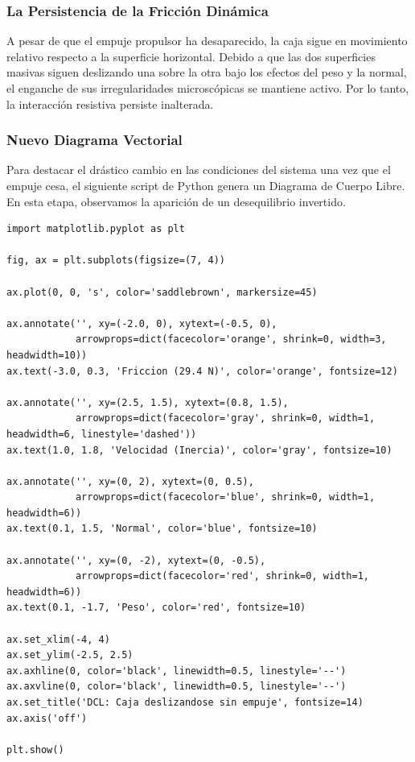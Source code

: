 \documentclass[12pt]{article}
\begin{document}
\subsubsection*{La Persistencia de la Fricción Dinámica}
A pesar de que el empuje propulsor ha desaparecido, la caja sigue en movimiento relativo respecto a la superficie horizontal. Debido a que las dos superficies masivas siguen deslizando una sobre la otra bajo los efectos del peso y la normal, el enganche de sus irregularidades microscópicas se mantiene activo. Por lo tanto, la interacción resistiva persiste inalterada.

\subsubsection*{Nuevo Diagrama Vectorial}
Para destacar el drástico cambio en las condiciones del sistema una vez que el empuje cesa, el siguiente script de Python genera un Diagrama de Cuerpo Libre. En esta etapa, observamos la aparición de un desequilibrio invertido.

\begin{lstlisting}
import matplotlib.pyplot as plt

fig, ax = plt.subplots(figsize=(7, 4))

ax.plot(0, 0, 's', color='saddlebrown', markersize=45)

ax.annotate('', xy=(-2.0, 0), xytext=(-0.5, 0), 
            arrowprops=dict(facecolor='orange', shrink=0, width=3, headwidth=10))
ax.text(-3.0, 0.3, 'Friccion (29.4 N)', color='orange', fontsize=12)

ax.annotate('', xy=(2.5, 1.5), xytext=(0.8, 1.5), 
            arrowprops=dict(facecolor='gray', shrink=0, width=1, headwidth=6, linestyle='dashed'))
ax.text(1.0, 1.8, 'Velocidad (Inercia)', color='gray', fontsize=10)

ax.annotate('', xy=(0, 2), xytext=(0, 0.5), 
            arrowprops=dict(facecolor='blue', shrink=0, width=1, headwidth=6))
ax.text(0.1, 1.5, 'Normal', color='blue', fontsize=10)

ax.annotate('', xy=(0, -2), xytext=(0, -0.5), 
            arrowprops=dict(facecolor='red', shrink=0, width=1, headwidth=6))
ax.text(0.1, -1.7, 'Peso', color='red', fontsize=10)

ax.set_xlim(-4, 4)
ax.set_ylim(-2.5, 2.5)
ax.axhline(0, color='black', linewidth=0.5, linestyle='--')
ax.axvline(0, color='black', linewidth=0.5, linestyle='--')
ax.set_title('DCL: Caja deslizandose sin empuje', fontsize=14)
ax.axis('off')

plt.show()
\end{lstlisting}
\end{document}
